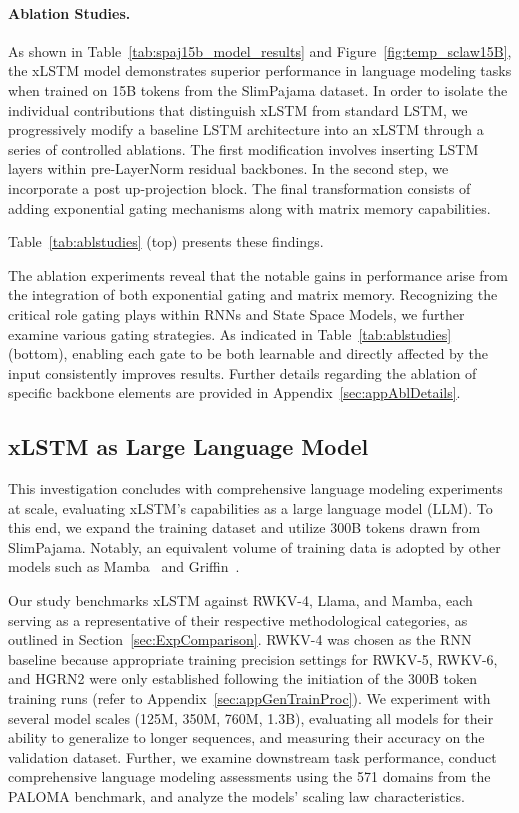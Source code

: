 \paragraph{Ablation Studies.}
As shown in Table~\ref{tab:spaj15b_model_results} and Figure~\ref{fig:temp_sclaw15B}, the xLSTM model demonstrates superior performance in language modeling tasks when trained on 15B tokens from the SlimPajama dataset. In order to isolate the individual contributions that distinguish xLSTM from standard LSTM, we progressively modify a baseline LSTM architecture into an xLSTM through a series of controlled ablations. The first modification involves inserting LSTM layers within pre-LayerNorm residual backbones. In the second step, we incorporate a post up-projection block. The final transformation consists of adding exponential gating mechanisms along with matrix memory capabilities.

Table~\ref{tab:ablstudies} (top) presents these findings.

The ablation experiments reveal that the notable gains in performance arise from the integration of both exponential gating and matrix memory. Recognizing the critical role gating plays within RNNs and State Space Models, we further examine various gating strategies. As indicated in Table~\ref{tab:ablstudies} (bottom), enabling each gate to be both learnable and directly affected by the input consistently improves results. Further details regarding the ablation of specific backbone elements are provided in Appendix~\ref{sec:appAblDetails}.

\subsection{xLSTM as Large Language Model}
\label{sec:ExpLanguage}

This investigation concludes with comprehensive language modeling experiments at scale, evaluating xLSTM's capabilities as a large language model (LLM). To this end, we expand the training dataset and utilize 300B tokens drawn from SlimPajama. Notably, an equivalent volume of training data is adopted by other models such as Mamba~\citep{Gu:24arxiv} and Griffin~\citep{De:24arxiv}.

Our study benchmarks xLSTM against RWKV-4, Llama, and Mamba, each serving as a representative of their respective methodological categories, as outlined in Section~\ref{sec:ExpComparison}. RWKV-4 was chosen as the RNN baseline because appropriate training precision settings for RWKV-5, RWKV-6, and HGRN2 were only established following the initiation of the 300B token training runs (refer to Appendix~\ref{sec:appGenTrainProc}). We experiment with several model scales (125M, 350M, 760M, 1.3B), evaluating all models for their ability to generalize to longer sequences, and measuring their accuracy on the validation dataset. Further, we examine downstream task performance, conduct comprehensive language modeling assessments using the 571 domains from the PALOMA benchmark, and analyze the models’ scaling law characteristics.

